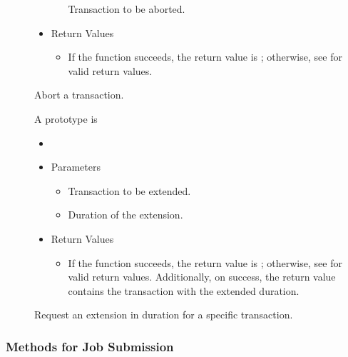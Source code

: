 \begin{description}
\begin{itemize}
\begin{itemize}
      Transaction to be aborted.
    \end{itemize}
    \item[] Return Values
    \begin{itemize}
      \item[] If the function succeeds, the return value is ; 
      otherwise, see  for valid return values. 
    \end{itemize}
  \end{itemize}  
  
  Abort a transaction.
\item [\Code{extendTransaction}]
  A prototype is

  \begin{itemize}
    \item[] 
    \item[] Parameters
    \begin{itemize}
      \item[] 

      Transaction to be extended.
      \item[]  

      Duration of the extension.
    \end{itemize}
    \item[] Return Values
    \begin{itemize}
      \item[] If the function succeeds, the return value is ; 
      otherwise, see  for valid return values. Additionally,
      on success, the return value contains the transaction with the extended
      duration.
    \end{itemize}
  \end{itemize}  
  
  Request an extension in duration for a specific transaction.
\end{description}

\subsubsection{\label{WebService-Submission} Methods for Job Submission}

